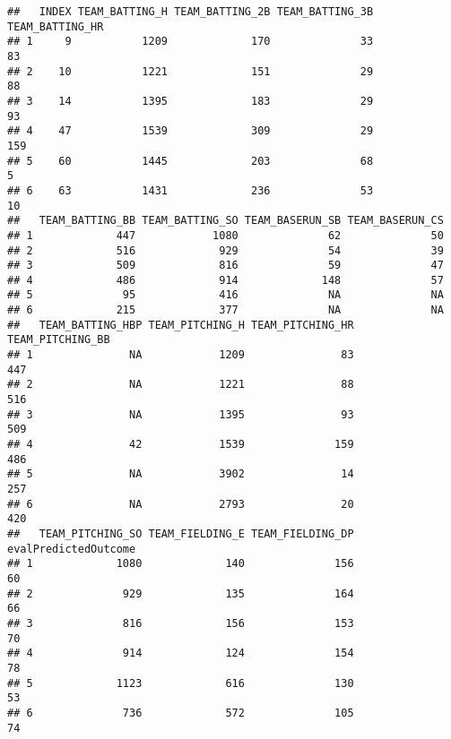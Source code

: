 \documentclass[
]{article}
\begin{document}
\begin{verbatim}
##   INDEX TEAM_BATTING_H TEAM_BATTING_2B TEAM_BATTING_3B TEAM_BATTING_HR
## 1     9           1209             170              33              83
## 2    10           1221             151              29              88
## 3    14           1395             183              29              93
## 4    47           1539             309              29             159
## 5    60           1445             203              68               5
## 6    63           1431             236              53              10
##   TEAM_BATTING_BB TEAM_BATTING_SO TEAM_BASERUN_SB TEAM_BASERUN_CS
## 1             447            1080              62              50
## 2             516             929              54              39
## 3             509             816              59              47
## 4             486             914             148              57
## 5              95             416              NA              NA
## 6             215             377              NA              NA
##   TEAM_BATTING_HBP TEAM_PITCHING_H TEAM_PITCHING_HR TEAM_PITCHING_BB
## 1               NA            1209               83              447
## 2               NA            1221               88              516
## 3               NA            1395               93              509
## 4               42            1539              159              486
## 5               NA            3902               14              257
## 6               NA            2793               20              420
##   TEAM_PITCHING_SO TEAM_FIELDING_E TEAM_FIELDING_DP evalPredictedOutcome
## 1             1080             140              156                   60
## 2              929             135              164                   66
## 3              816             156              153                   70
## 4              914             124              154                   78
## 5             1123             616              130                   53
## 6              736             572              105                   74
\end{verbatim}
\end{document}
